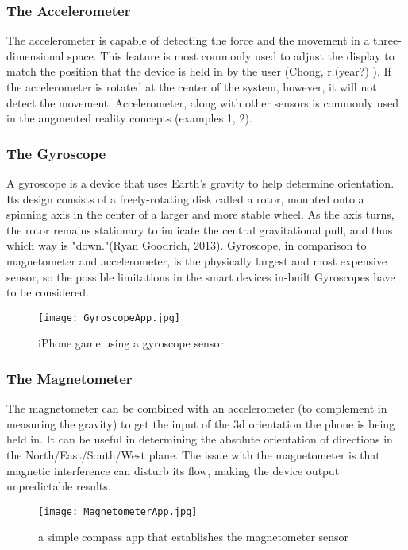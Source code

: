 \subsubsection*{The Accelerometer}
The accelerometer is capable of detecting the force and the movement in a three-dimensional space. This feature is most commonly used to adjust the display to match the position that the device is held in by the user (Chong, r.(year?) ). If the accelerometer is rotated at the center of the system, however, it will not detect the movement. Accelerometer, along with other sensors is commonly used in the augmented reality concepts (examples 1, 2).
\subsubsection*{The Gyroscope}
A gyroscope is a device that uses Earth's gravity to help determine orientation. Its design consists of a freely-rotating disk called a rotor, mounted onto a spinning axis in the center of a larger and more stable wheel. As the axis turns, the rotor remains stationary to indicate the central gravitational pull, and thus which way is "down."(Ryan Goodrich, 2013). Gyroscope, in comparison to magnetometer and accelerometer, is the physically largest and most expensive sensor, so the possible limitations in the smart devices in-built Gyroscopes have to be considered. 

\begin{figure}[H]
\centering
\texttt{[image: GyroscopeApp.jpg]}
\caption{iPhone game using a gyroscope sensor}
\end{figure}

\subsubsection*{The Magnetometer}
The magnetometer can be combined with an accelerometer (to complement in measuring the gravity) to get the input of the 3d orientation the phone is being held in. It can be useful in determining the absolute orientation of directions in the North/East/South/West plane. The issue with the magnetometer is that magnetic interference can disturb its flow, making the device output unpredictable results.

\begin{figure}[H]
\centering
\texttt{[image: MagnetometerApp.jpg]}
\caption{a simple compass app that establishes the magnetometer sensor}
\end{figure}

